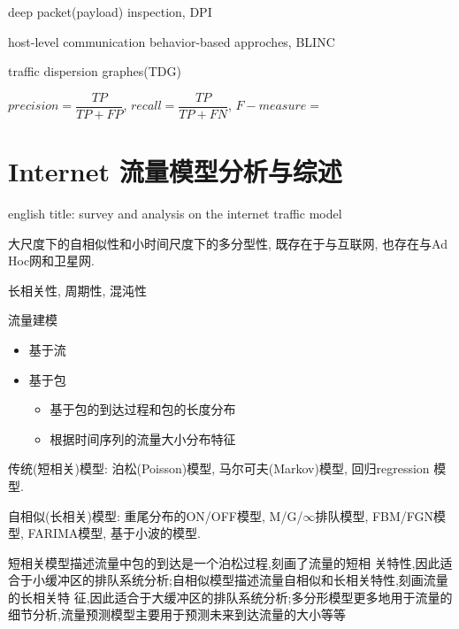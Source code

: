 \documentclass{article}
\begin{document}
deep packet(payload) inspection, DPI

host-level communication behavior-based approches, BLINC

traffic dispersion graphes(TDG)

$precision = \dfrac{TP}{TP + FP}$, $recall = \dfrac{TP}{TP+FN}$, $F-measure = $

\section{Internet 流量模型分析与综述}
english title: survey and analysis on the internet traffic model

大尺度下的自相似性和小时间尺度下的多分型性, 既存在于与互联网, 也存在与Ad Hoc网和卫星网.

长相关性, 周期性, 混沌性

流量建模
\begin{itemize}
	\item 基于流
	\item 基于包
		\begin{itemize}
			\item 基于包的到达过程和包的长度分布
			\item 根据时间序列的流量大小分布特征
		\end{itemize}
\end{itemize}

传统(短相关)模型: 泊松(Poisson)模型, 马尔可夫(Markov)模型, 回归regression 模型.  

自相似(长相关)模型: 重尾分布的ON/OFF模型, M/G/$\infty$排队模型, FBM/FGN模型, FARIMA模型, 基于小波的模型.

短相关模型描述流量中包的到达是一个泊松过程,刻画了流量的短相 关特性,因此适合于小缓冲区的排队系统分析;自相似模型描述流量自相似和长相关特性,刻画流量的长相关特
征,因此适合于大缓冲区的排队系统分析;多分形模型更多地用于流量的细节分析,流量预测模型主要用于预测未来到达流量的大小等等
\end{document}
